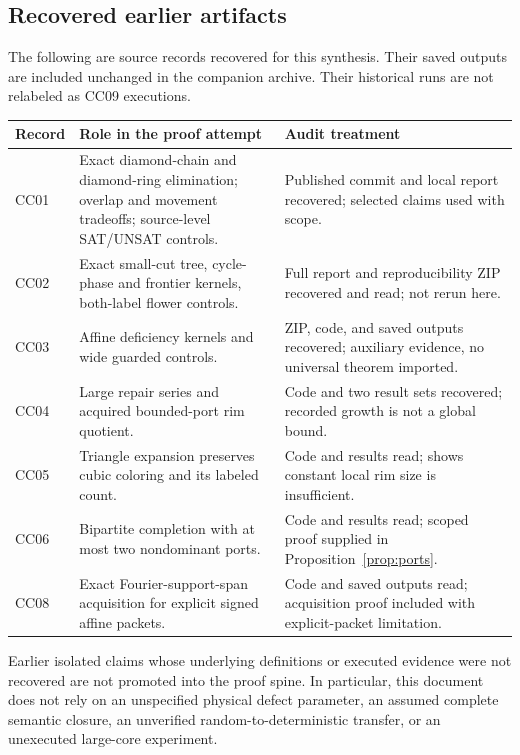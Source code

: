 \documentclass[11pt,letterpaper]{article}
\theoremstyle{definition}
\begin{document}
\subsection{Recovered earlier artifacts}

The following are source records recovered for this synthesis. Their saved outputs are included unchanged in the companion archive. Their historical runs are not relabeled as CC09 executions.

\begin{longtable}{p{}p{}p{}}
\toprule
Record & Role in the proof attempt & Audit treatment\\
\midrule
\endhead
CC01 & Exact diamond-chain and diamond-ring elimination; overlap and movement tradeoffs; source-level SAT/UNSAT controls. & Published commit and local report recovered; selected claims used with scope.\\
CC02 & Exact small-cut tree, cycle-phase and frontier kernels, both-label flower controls. & Full report and reproducibility ZIP recovered and read; not rerun here.\\
CC03 & Affine deficiency kernels and wide guarded controls. & ZIP, code, and saved outputs recovered; auxiliary evidence, no universal theorem imported.\\
CC04 & Large repair series and acquired bounded-port rim quotient. & Code and two result sets recovered; recorded growth is not a global bound.\\
CC05 & Triangle expansion preserves cubic coloring and its labeled count. & Code and results read; shows constant local rim size is insufficient.\\
CC06 & Bipartite completion with at most two nondominant ports. & Code and results read; scoped proof supplied in Proposition~\ref{prop:ports}.\\
CC08 & Exact Fourier-support-span acquisition for explicit signed affine packets. & Code and saved outputs read; acquisition proof included with explicit-packet limitation.\\
\bottomrule
\end{longtable}

Earlier isolated claims whose underlying definitions or executed evidence were not recovered are not promoted into the proof spine. In particular, this document does not rely on an unspecified physical defect parameter, an assumed complete semantic closure, an unverified random-to-deterministic transfer, or an unexecuted large-core experiment.
\end{document}

